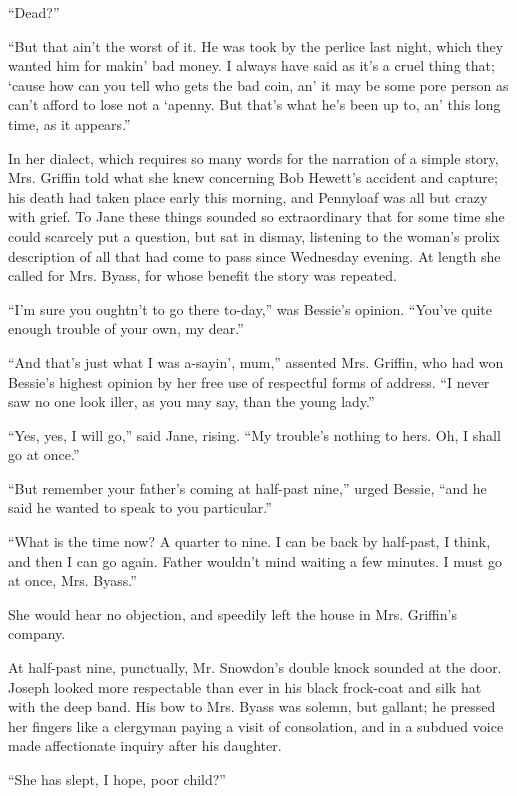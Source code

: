 ``Dead?''

``But that ain't the worst of it. He was took by the perlice last night,
which they wanted him for makin' bad money. I always have said as it's a
cruel thing that; `cause how can you tell who gets the bad coin, an' it
may be some pore person as can't afford to lose not a `apenny. But
that's what he's been up to, an' this long time, as it appears.''

In her dialect, which requires so many words for the narration of a
simple story, Mrs. Griffin {}told what she knew concerning Bob Hewett's
accident and capture; his death had taken place early this morning, and
Pennyloaf was all but crazy with grief. To Jane these things sounded so
extraordinary that for some time she could scarcely put a question, but
sat in dismay, listening to the woman's prolix description of all that
had come to pass since Wednesday evening. At length she called for Mrs.
Byass, for whose benefit the story was repeated.

``I'm sure you oughtn't to go there to-day,'' was Bessie's opinion.
``You've quite enough trouble of your own, my dear.''

``And that's just what I was a-sayin', mum,'' assented Mrs. Griffin, who
had won Bessie's highest opinion by her free use of respectful forms of
address. ``I never saw no one look iller, as you may say, than the young
lady.''

``Yes, yes, I will go,'' said Jane, rising. ``My trouble's nothing to
hers. Oh, I shall go at once.''

``But remember your father's coming at half-past nine,'' urged Bessie,
``and he said he wanted to speak to you particular.''

``What is the time now? A quarter to {}nine. I can be back by half-past,
I think, and then I can go again. Father wouldn't mind waiting a few
minutes. I must go at once, Mrs. Byass.''

She would hear no objection, and speedily left the house in Mrs.
Griffin's company.

At half-past nine, punctually, Mr. Snowdon's double knock sounded at the
door. Joseph looked more respectable than ever in his black frock-coat
and silk hat with the deep band. His bow to Mrs. Byass was solemn, but
gallant; he pressed her fingers like a clergyman paying a visit of
consolation, and in a subdued voice made affectionate inquiry after his
daughter.

``She has slept, I hope, poor child?''

